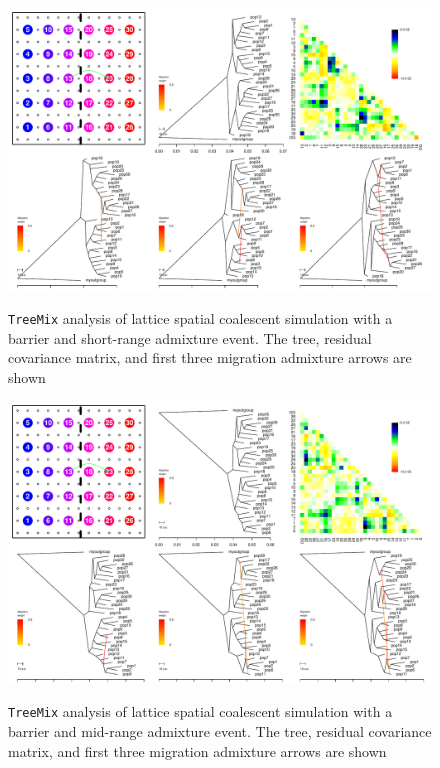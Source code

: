 \documentclass[10pt,letterpaper]{article}
\begin{document}
\begin{figure}
	\centering
		{\includegraphics[width=\textwidth]{../figs/sims/Treemix_comparison/ms_dataset_neighbor_admixturetreemix_fig_sequential.pdf}}
	\caption{\texttt{TreeMix} analysis of lattice spatial coalescent simulation with a barrier and short-range admixture event.  The tree, residual covariance matrix, and first three migration admixture arrows are shown}\label{sfig:treemix_neighboradmixture}
\end{figure}

\begin{figure}
	\centering
		{\includegraphics[width=\textwidth]{../figs/sims/Treemix_comparison/ms_dataset_barrier_and_inland_admixturetreemix_fig_sequential.pdf}}
	\caption{\texttt{TreeMix} analysis of lattice spatial coalescent simulation with a barrier and mid-range admixture event.  The tree, residual covariance matrix, and first three migration admixture arrows are shown}\label{sfig:treemix_inlandadmixture}
\end{figure}
\end{document}
